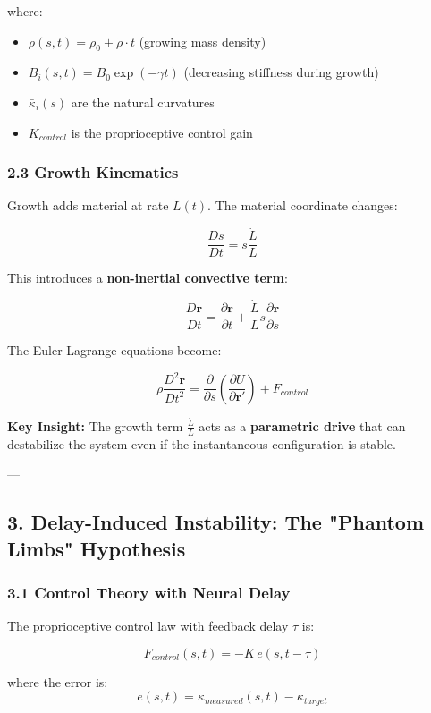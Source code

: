\documentclass[11pt,a4paper]{article}
\begin{document}
where:

\begin{itemize}
\item $\rho(s,t) = \rho_0 + \dot{\rho} \cdot t$ (growing mass density)
\item $B_i(s,t) = B_0 \exp(-\gamma t)$ (decreasing stiffness during growth)
\item $\bar{\kappa}_i(s)$ are the natural curvatures
\item $K_{control}$ is the proprioceptive control gain
\end{itemize}

\subsubsection{2.3 Growth Kinematics}

Growth adds material at rate $\dot{L}(t)$. The material coordinate changes:

$$
\frac{D s}{D t} = s \frac{\dot{L}}{L}
$$

This introduces a \textbf{non-inertial convective term}:

$$
\frac{D \mathbf{r}}{D t} = \frac{\partial \mathbf{r}}{\partial t} + \frac{\dot{L}}{L} s \frac{\partial \mathbf{r}}{\partial s}
$$

The Euler-Lagrange equations become:

$$
\rho \frac{D^2 \mathbf{r}}{D t^2} = \frac{\partial}{\partial s}\left(\frac{\partial U}{\partial \mathbf{r}'}\right) + F_{control}
$$

\textbf{Key Insight:} The growth term $\frac{\dot{L}}{L}$ acts as a \textbf{parametric drive} that can destabilize the system even if the instantaneous configuration is stable.

---

\subsection{3. Delay-Induced Instability: The "Phantom Limbs" Hypothesis}

\subsubsection{3.1 Control Theory with Neural Delay}

The proprioceptive control law with feedback delay $\tau$ is:

$$
F_{control}(s,t) = -K \, e(s, t-\tau)
$$

where the error is:
$$
e(s,t) = \kappa_{measured}(s,t) - \kappa_{target}
$$
\end{document}
